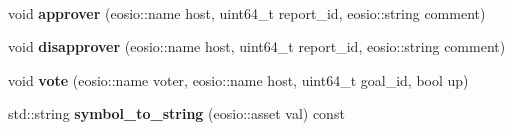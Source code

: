 \begin{DoxyCompactItemize}
$$\item 
\mbox{\label{classeosio_1_1unicore_a13154bd4bc646cd0adf1f5d856b06ecb}} 
void {\bfseries approver} (eosio\+::name host, uint64\+\_\+t report\+\_\+id, eosio\+::string comment)
\item 
\mbox{\label{classeosio_1_1unicore_ac72ce32fef399e009237b3efb04cbb88}} 
void {\bfseries disapprover} (eosio\+::name host, uint64\+\_\+t report\+\_\+id, eosio\+::string comment)
\item 
\mbox{\label{classeosio_1_1unicore_a9f959b326fccc37b6d0edff7ac941c77}} 
void {\bfseries vote} (eosio\+::name voter, eosio\+::name host, uint64\+\_\+t goal\+\_\+id, bool up)
\item 
\mbox{\label{classeosio_1_1unicore_a2464971a6336dedb991282d0b396177e}} 
std\+::string {\bfseries symbol\+\_\+to\+\_\+string} (eosio\+::asset val) const
\end{DoxyCompactItemize}
